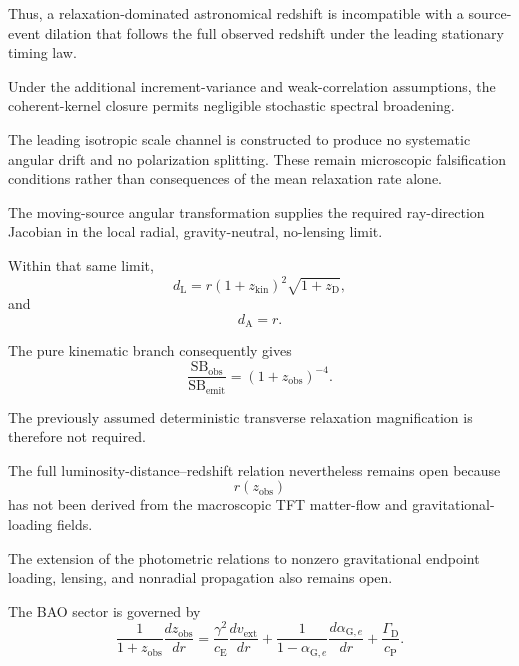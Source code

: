 Thus, a relaxation-dominated astronomical redshift is incompatible with a
source-event dilation that follows the full observed redshift under the
leading stationary timing law.

Under the additional increment-variance and weak-correlation assumptions, the
coherent-kernel closure permits negligible stochastic spectral broadening.

The leading isotropic scale channel is constructed to produce no systematic
angular drift and no polarization splitting. These remain microscopic
falsification conditions rather than consequences of the mean relaxation rate
alone.

The moving-source angular transformation supplies the required ray-direction
Jacobian in the local radial, gravity-neutral, no-lensing limit.

Within that same limit,
\begin{equation}
    d_{\mathrm L}
    =
    r
    (1+z_{\mathrm{kin}})^2
    \sqrt{
        1+z_{\mathrm D}
    },
\end{equation}
and
\begin{equation}
    d_{\mathrm A}
    =
    r.
\end{equation}

The pure kinematic branch consequently gives
\begin{equation}
    \frac{
        \mathrm{SB}_{\mathrm{obs}}
    }{
        \mathrm{SB}_{\mathrm{emit}}
    }
    =
    (1+z_{\mathrm{obs}})^{-4}.
\end{equation}

The previously assumed deterministic transverse relaxation magnification is
therefore not required.

The full luminosity-distance--redshift relation nevertheless remains open
because
\begin{equation}
    r(z_{\mathrm{obs}})
\end{equation}
has not been derived from the macroscopic TFT matter-flow and
gravitational-loading fields.

The extension of the photometric relations to nonzero gravitational endpoint
loading, lensing, and nonradial propagation also remains open.

The BAO sector is governed by
\begin{equation}
    \frac{1}{
        1+z_{\mathrm{obs}}
    }
    \frac{
        dz_{\mathrm{obs}}
    }{
        dr
    }
    =
    \frac{
        \gamma^2
    }{
        c_{\mathrm E}
    }
    \frac{
        dv_{\mathrm{ext}}
    }{
        dr
    }
    +
    \frac{1}{
        1-\alpha_{\mathrm G,e}
    }
    \frac{
        d\alpha_{\mathrm G,e}
    }{
        dr
    }
    +
    \frac{
        \Gamma_{\mathrm D}
    }{
        c_{\mathrm P}
    }.
\end{equation}

